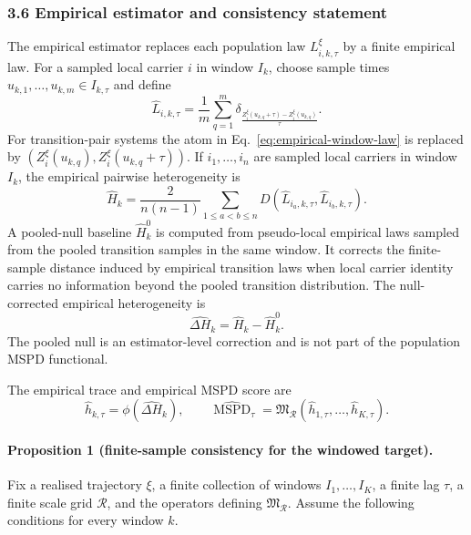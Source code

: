 \subsubsection*{3.6 Empirical estimator and consistency statement}
\label{method:finite-estimator}

The empirical estimator replaces each population law \(L_{i,k,\tau}^{\xi}\) by a finite empirical law.  For a sampled local carrier \(i\) in window \(I_k\), choose sample times \(u_{k,1},\ldots,u_{k,m}\in I_{k,\tau}\) and define
\begin{equation}
\widehat L_{i,k,\tau}
  =
  \frac{1}{m}
  \sum_{q=1}^{m}
  \delta_{\frac{Z_i^\xi(u_{k,q}+\tau)-Z_i^\xi(u_{k,q})}{\tau}}.
  \label{eq:empirical-window-law}
\end{equation}
For transition-pair systems the atom in Eq.~\eqref{eq:empirical-window-law} is replaced by \((Z_i^\xi(u_{k,q}),Z_i^\xi(u_{k,q}+\tau))\).  If \(i_1,\ldots,i_n\) are sampled local carriers in window \(I_k\), the empirical pairwise heterogeneity is
\begin{equation}
\widehat H_k
  =
  \frac{2}{n(n-1)}
  \sum_{1\le a<b\le n}
  D\left(
    \widehat L_{i_a,k,\tau},
    \widehat L_{i_b,k,\tau}
  \right).
  \label{eq:empirical-window-H}
\end{equation}
A pooled-null baseline \(\widehat H_k^0\) is computed from pseudo-local empirical laws sampled from the pooled transition samples in the same window.  It corrects the finite-sample distance induced by empirical transition laws when local carrier identity carries no information beyond the pooled transition distribution.  The null-corrected empirical heterogeneity is
\begin{equation}
\widehat{\Delta H}_k
  =
  \widehat H_k-\widehat H_k^0.
  \label{eq:delta-H-estimator}
\end{equation}
The pooled null is an estimator-level correction and is not part of the population MSPD functional.

The empirical trace and empirical MSPD score are
\begin{equation}
\widehat h_{k,\tau}
  =
  \phi(\widehat{\Delta H}_k),
  \qquad
  \widehat{\operatorname{MSPD}}_{\tau}
  =
  \mathfrak M_{\mathcal R}
  (\widehat h_{1,\tau},\ldots,\widehat h_{K,\tau}).
  \label{eq:empirical-mspd}
\end{equation}

\paragraph{Proposition 1 (finite-sample consistency for the windowed target).}
Fix a realised trajectory \(\xi\), a finite collection of windows \(I_1,\ldots,I_K\), a finite lag \(\tau\), a finite scale grid \(\mathcal R\), and the operators defining \(\mathfrak M_{\mathcal R}\).  Assume the following conditions for every window \(k\).


